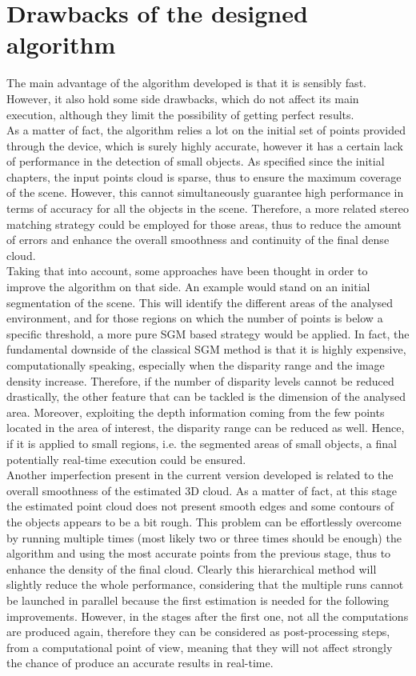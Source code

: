 \section{Drawbacks of the designed algorithm}
\label{section:algorithm-drawbacks}

The main advantage of the algorithm developed is that it is sensibly fast.
However, it also hold some side drawbacks, which do not affect its main execution, although they limit the possibility of getting perfect results.\\
As a matter of fact, the algorithm relies a lot on the initial set of points provided through the device, which is surely highly accurate, however it has a certain lack of performance in the detection of small objects.
As specified since the initial chapters, the input points cloud is sparse, thus to ensure the maximum coverage of the scene. 
However, this cannot simultaneously guarantee high performance in terms of accuracy for all the objects in the scene.
Therefore, a more related stereo matching strategy could be employed for those areas, thus to reduce the amount of errors and enhance the overall smoothness and continuity of the final dense cloud.\\
Taking that into account, some approaches have been thought in order to improve the algorithm on that side.
An example would stand on an initial segmentation of the scene.
This will identify the different areas of the analysed environment, and for those regions on which the number of points is below a specific threshold, a more pure SGM based strategy would be applied. 
In fact, the fundamental downside of the classical SGM method is that it is highly expensive, computationally speaking, especially when the disparity range and the image density increase.
Therefore, if the number of disparity levels cannot be reduced drastically, the other feature that can be tackled is the dimension of the analysed area.
Moreover, exploiting the depth information coming from the few points located in the area of interest, the disparity range can be reduced as well.
Hence, if it is applied to small regions, i.e. the segmented areas of small objects, a final potentially real-time execution could be ensured.\\
Another imperfection present in the current version developed is related to the overall smoothness of the estimated 3D cloud.
As a matter of fact, at this stage the estimated point cloud does not present smooth edges and some contours of the objects appears to be a bit rough.
This problem can be effortlessly overcome by running multiple times (most likely two or three times should be enough) the algorithm and using the most accurate points from the previous stage, thus to enhance the density of the final cloud. 
Clearly this hierarchical method will slightly reduce the whole performance, considering that the multiple runs cannot be launched in parallel because the first estimation is needed for the following improvements.
However, in the stages after the first one, not all the computations are produced again, therefore they can be considered as post-processing steps, from a computational point of view, meaning that they will not affect strongly the chance of produce an accurate results in real-time.

